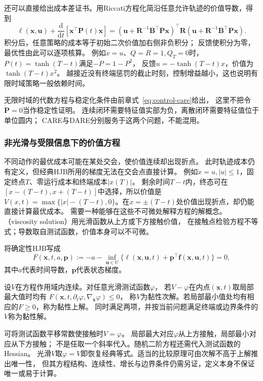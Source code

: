还可以直接给出成本差证书。用Riccati方程化简沿任意允许轨迹的价值导数，得到
\[
  \ell(\bm x,\bm u)+\frac{\mathrm d}{\mathrm dt}
    [\bm x^\top\bm P(t)\bm x]
  =
  (\bm u+\bm R^{-1}\bm B^\top\bm P\bm x)^\top
    \bm R(\bm u+\bm R^{-1}\bm B^\top\bm P\bm x).
\]
积分后，任意策略的成本等于初始二次价值加右侧非负积分；
反馈使积分为零，最优性由此可以逐项核算。
例如$\dot x=u$、$Q=R=1,Q_T=0$时，
$P(t)=\tanh(T-t)$满足$-\dot P=1-P^2$，
反馈$u=-\tanh(T-t)x$，价值为$\tanh(T-t)x^2$。
越接近没有终端惩罚的截止时刻，控制增益越小，这也说明有限时域策略一般依赖时间。

无限时域的代数方程与稳定化条件由前章式~\eqref{eq:control-care}给出，
这里不把令$\dot{\bm P}=0$当作稳定性证明。
连续闭环需要特征值实部为负，离散闭环需要特征值位于单位圆内；
CARE与DARE分别服务于这两个问题，不能混用。

\subsubsection{非光滑与受限信息下的价值方程}

不同动作的最优成本可能在某处交会，使价值连续却出现折点。
此时轨迹成本仍有定义，但经典HJB所用的梯度无法在交会点直接计算。
例如$\dot x=u,|u|\leq1$，固定终点$T$、零运行成本和终端成本$|x(T)|$。
剩余时间$T-t$内，终态可在$[x-(T-t),x+(T-t)]$中选择，所以价值是
$V(x,t)=\max\{|x|-(T-t),0\}$。在$x=\pm(T-t)$处价值出现折点，却仍能直接计算最优成本。
需要一种能够在这些不可微处解释方程的解概念。
（viscosity solution）用光滑函数从上方或下方接触价值，
在接触点检验方程不等式；导数取自测试函数，价值本身可以不可微。

将确定性HJB写成
\[
  F(\bm x,t,a,\bm p)
  :=-a-\inf_{\bm u\in U}
      \{\ell(\bm x,\bm u,t)+\bm p^\top\bm f(\bm x,\bm u,t)\}=0,
\]
其中$a$代表时间导数，$\bm p$代表状态梯度。
\begin{definition}[连续价值函数的黏性解]
\label{def:control-viscosity-solution}
设$V$在方程作用域内连续。对任意光滑测试函数$\varphi$，
若$V-\varphi$在内点$(\bm x,t)$取局部最大值时均有
$F(\bm x,t,\partial_t\varphi,\nabla_{\bm x}\varphi)\leq0$，
称$V$为黏性次解。若局部最小值处均有相应的$F\geq0$，称为黏性上解。
同时满足两项，并按当前问题满足终端或边界条件的$V$称为黏性解。
\end{definition}
可将测试函数平移常数使接触时$V=\varphi$。
局部最大对应$\varphi$从上方接触，局部最小对应从下方接触；
不是任取一个斜率代入。随机二阶方程还需代入测试函数的Hessian。
光滑$V$取$\varphi=V$即恢复经典等式。适当的比较原理可由次解不高于上解推出唯一性，
但其方程结构、连续性、增长与边界条件仍需另证，定义本身不保证唯一或易于计算。

